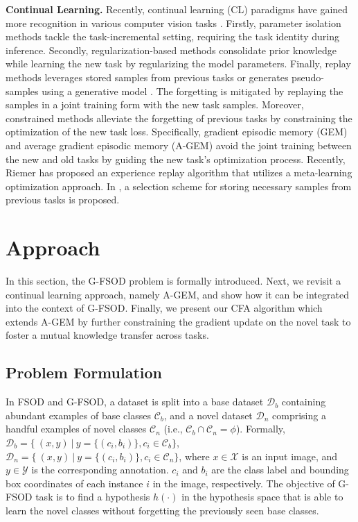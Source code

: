 \documentclass[10pt,twocolumn,letterpaper]{article}
\begin{document}
\textbf{Continual Learning.} Recently, continual learning (CL) paradigms have gained more recognition in various computer vision tasks \cite{cl_survey}. Firstly, parameter isolation methods \cite{packnet, piggyback, hat, expert_gate, rcl, dan} tackle the task-incremental setting, requiring the task identity during inference. Secondly, regularization-based methods \cite{ewc, lwf, si, lfl, ebll, dmc} consolidate prior knowledge while learning the new task by regularizing the model parameters. Finally, replay methods \cite{iCarl, dgr, er, ser, tem, cope, pr, cclugm, lgm, gem, agem, MER, gss} leverages stored samples from previous tasks \cite{iCarl} or generates pseudo-samples using a generative model \cite{dgr}. The forgetting is mitigated by replaying the samples in a joint training form with the new task samples. Moreover, constrained methods \cite{gem, agem, MER, gss} alleviate the forgetting of previous tasks by constraining the optimization of the new task loss. Specifically, gradient episodic memory (GEM) \cite{gem} and average gradient episodic memory (A-GEM) \cite{agem} avoid the joint training between the new and old tasks by guiding the new task's optimization process. Recently, Riemer \etal \cite{MER} has proposed an experience replay algorithm that utilizes a meta-learning optimization approach. In \cite{gss}, a selection scheme for storing necessary samples from previous tasks is proposed. 


\section{Approach}
In this section, the G-FSOD problem is formally introduced. Next, we revisit a continual learning approach, namely A-GEM\cite{agem}, and show how it can be integrated into the context of G-FSOD. Finally, we present our CFA algorithm which extends A-GEM by further constraining the gradient update on the novel task to foster a mutual knowledge transfer across tasks.   

\subsection{Problem Formulation}
In FSOD and G-FSOD, a dataset is split into a base dataset $\mathcal{D}_b$ containing abundant examples of base classes $\mathcal{C}_b$, and a novel dataset $\mathcal{D}_n$ comprising a handful examples of novel classes $\mathcal{C}_n$ (i.e., $\mathcal{C}_b \cap \mathcal{C}_n = \phi$). Formally, $\mathcal{D}_b=\{\ (x, y)\ |~y = \{(c_{i},b_{i})\}, c_{i} \in \mathcal{C}_{b}\}$, $\mathcal{D}_n=\{\ (x, y)\ |~y = \{(c_{i},b_{i})\}, c_{i} \in \mathcal{C}_{n}\}$, where $x \in \mathcal{X}$ is an input image, and  $y \in \mathcal{Y}$ is the corresponding annotation. $c_i$ and $b_i$ are  the class label and bounding box coordinates of each instance $i$ in the image, respectively. The objective of G-FSOD task is to find a hypothesis $h(\cdot)$ in the hypothesis space that is able to learn the novel classes without forgetting the previously seen base classes.
\end{document}
